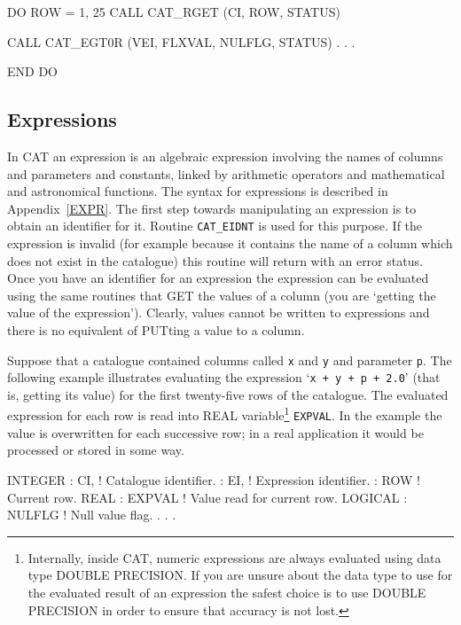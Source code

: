 \documentclass[11pt,twoside]{starlink}
\begin{document}
\begin{terminalv}
      DO ROW = 1, 25
         CALL CAT_RGET (CI, ROW, STATUS)

         CALL CAT_EGT0R (VEI, FLXVAL, NULFLG, STATUS)
           .
           .
           .

      END DO
\end{terminalv}


\subsection{Expressions}

In CAT an expression is an algebraic expression involving the names of
columns and parameters and constants, linked by arithmetic operators and
mathematical and astronomical functions. The syntax for expressions is
described in Appendix~\ref{EXPR}. The first step towards manipulating an
expression is to obtain an identifier for it. Routine \texttt{CAT\_EIDNT}
is used for this purpose. If the expression is invalid (for example
because it contains the name of a column which does not exist in the
catalogue) this routine will return with an error status. Once you have
an identifier for an expression the expression can be evaluated using
the same routines that GET the values of a column (you are `getting the
value of the expression'). Clearly, values cannot be written to
expressions and there is no equivalent of PUTting a value to a column.

Suppose that a catalogue contained columns called \texttt{x} and \texttt{y}
and parameter \texttt{p}. The following example illustrates evaluating the
expression `\texttt{x + y + p + 2.0}' (that is, getting its value) for the
first twenty-five rows of the catalogue. The evaluated expression for
each row is read into REAL variable\footnote{Internally, inside CAT,
numeric expressions are always evaluated using data type DOUBLE
PRECISION. If you are unsure about the data type to use for the
evaluated result of an expression the safest choice is to use DOUBLE
PRECISION in order to ensure that accuracy is not lost.} \texttt{EXPVAL}.
In the example the value is overwritten for each successive row; in a
real application it would be processed or stored in some way.

\begin{terminalv}
      INTEGER
     :  CI,      ! Catalogue identifier.
     :  EI,      ! Expression identifier.
     :  ROW      ! Current row.
      REAL
     :  EXPVAL   ! Value read for current row.
      LOGICAL
     :  NULFLG   ! Null value flag.
       .
       .
       .
\end{terminalv}
\end{document}
